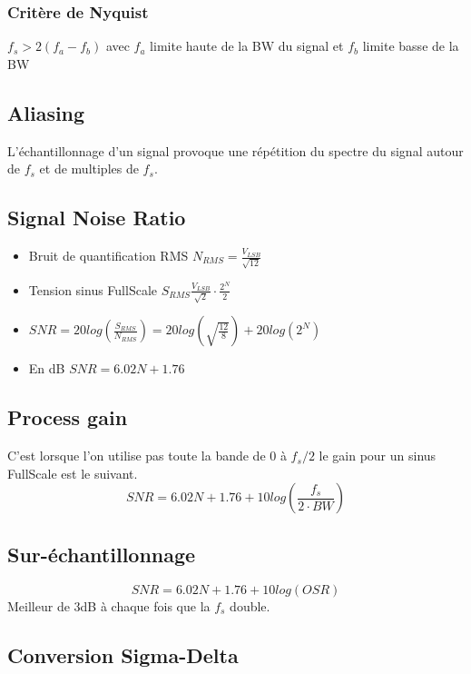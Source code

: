 \documentclass[resume]{subfiles}
\begin{document}
\begin{multicols}{3}
\subsubsection{Critère de Nyquist}
$f_s > 2(f_a-f_b)$ avec $f_a$ limite haute de la BW du signal et $f_b$ limite basse de la BW

\subsection{Aliasing}
L'échantillonnage d'un signal provoque une répétition du spectre du signal autour de $f_s$ et de multiples de $f_s$.

\subsection{Signal Noise Ratio}
\begin{itemize}
\item Bruit de quantification RMS $N_{RMS} = \frac{V_{LSB}}{\sqrt{12}}$
\item Tension sinus FullScale $S_{RMS}\frac{V_{LSB}}{\sqrt{2}}\cdot \frac{2^N}{2}$
\item $SNR = 20log(\frac{S_{RMS}}{N_{RMS}}) = 20log(\sqrt{\frac{12}{8}}) + 20log(2^N)$
\item En dB $SNR = 6.02N + 1.76 $
\end{itemize}

\subsection{Process gain}
C'est lorsque l'on utilise pas toute la bande de 0 à $f_s/2$
le gain pour un sinus FullScale est le suivant.
\begin{equation}
SNR = 6.02N + 1.76 + 10log(\frac{f_s}{2\cdot BW})
\end{equation}

\subsection{Sur-échantillonnage}
\begin{equation}
SNR = 6.02N + 1.76 + 10log(OSR)
\end{equation}
Meilleur de 3dB à chaque fois que la $f_s$ double.

\subsection{Conversion Sigma-Delta}

\end{multicols}
\end{document}
